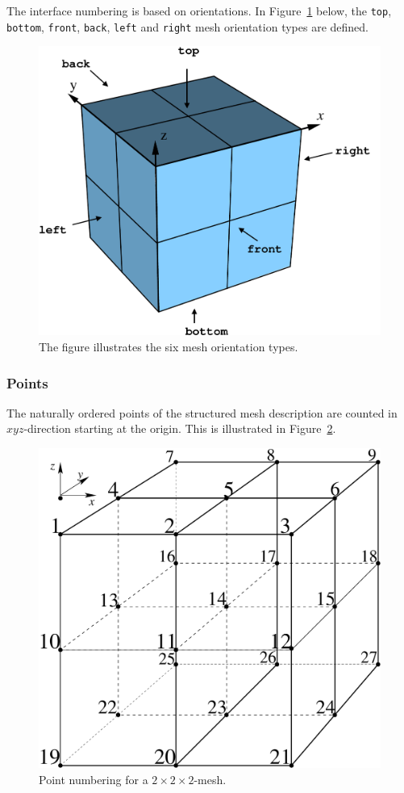 The interface numbering is based on orientations. In
Figure~\ref{fig:orient} below, the \texttt{top}, \texttt{bottom},
\texttt{front}, \texttt{back}, \texttt{left} and \texttt{right} mesh
orientation types are defined.
%
\begin{figure}
  \centering
  \includegraphics[scale=0.4]{../figures/structorientation}
  \caption{The figure illustrates the six mesh orientation types.}
  \label{fig:orient}
\end{figure}
%

\subsubsection{Points}
%
The naturally ordered points of the structured mesh description are
counted in $xyz$-direction starting at the origin. This is illustrated
in Figure~\ref{fig:cpnumber}. 
%
\begin{figure}
  \centering
  \includegraphics[scale=0.3]{../figures/pointnum}
  \caption{Point numbering for a $2 \times 2 \times 2$-mesh.}
  \label{fig:cpnumber}
\end{figure}
%

